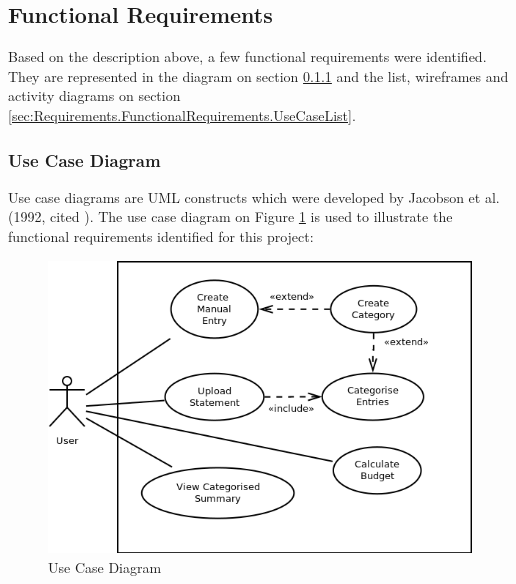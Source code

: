 \subsection{Functional Requirements} \label{sec:Requirements.FunctionalRequirements}

Based on the description above, a few functional requirements were identified.
They are represented in the diagram on section
\ref{sec:Requirements.FunctionalRequirements.UseCaseDiagram} and the list,
wireframes and activity diagrams on section
\ref{sec:Requirements.FunctionalRequirements.UseCaseList}.

\subsubsection{Use Case Diagram} \label{sec:Requirements.FunctionalRequirements.UseCaseDiagram}
Use case diagrams are UML constructs which were developed by Jacobson et al.
(1992, cited \cite[][p.~154]{bennett2010object}). The use case diagram on
Figure \ref{fig:UseCaseDiagram} is used to illustrate the functional
requirements identified for this project:
\begin{figure}[ht!]
  \begin{center}
    \includegraphics[width=14cm]{./contents/img/Use_Case_Diagram.png}
  \end{center}
  \caption{Use Case Diagram}
  \label{fig:UseCaseDiagram}
\end{figure}
\FloatBarrier



